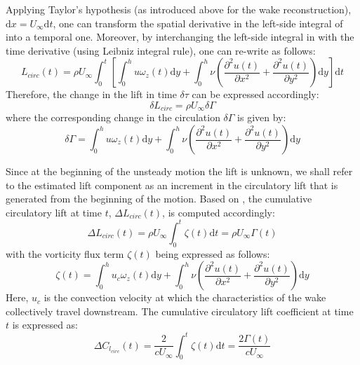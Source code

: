 \documentclass[12pt,a4paper]{article}
\begin{document}
Applying Taylor's hypothesis (as introduced above for the wake reconstruction), $\mathrm{d} x = U_\infty \mathrm{d}t$, one can transform the spatial derivative in the left-side integral of  into a temporal one. 
Moreover, by interchanging the left-side integral in  with the time derivative (using Leibniz integral rule), one can re-write  as follows:
\begin{equation}
L_{circ}(t) = \rho U_\infty \int_0^t \left[ \int_0^h u\omega_z(t)\mathrm{d}y +  \int_0^h\nu \left( \frac{\partial^2u(t)}{\partial x^2} + \frac{\partial^2u(t)}{\partial y^2} \right)\mathrm{d}y \right] \mathrm{d}t
\label{eq:inst_Lift2}
\end{equation}
Therefore, the change in the lift in time $\delta\tau$ can be expressed accordingly:
\begin{equation}
\delta L_{circ} = \rho U_\infty  \delta\Gamma
\label{eq:delL}
\end{equation}
where the corresponding change in the circulation $\delta \Gamma$ is given by:
\begin{equation}
\delta\Gamma =  \int_0^h u\omega_z(t)\mathrm{d}y +  \int_0^h\nu \left( \frac{\partial^2u(t)}{\partial x^2} + \frac{\partial^2u(t)}{\partial y^2} \right)\mathrm{d}y
\label{eq:delGamma}
\end{equation}

Since at the beginning of the unsteady motion the lift is unknown, we shall refer to the estimated lift component as an increment in the circulatory lift \cite{Stalnov2015,BenGida2016} that is generated from the beginning of the motion. 
Based on , the cumulative circulatory lift at time $t$, $\Delta L_{circ}(t)$, is computed accordingly:
\begin{equation}
\Delta L_{circ} (t)= \rho U_\infty \int_0^t \zeta(t)\mathrm{d}t = \rho U_\infty \Gamma(t)
\label{eq:dL-circ}
\end{equation}
with the vorticity flux term $\zeta(t)$ being expressed as follows:
\begin{equation}
\zeta(t) = \int_0^h u_c\omega_z(t)\mathrm{d}y +  \int_0^h\nu \left( \frac{\partial^2u(t)}{\partial x^2} + \frac{\partial^2u(t)}{\partial y^2} \right)\mathrm{d}y
\label{eq:zeta_vs_time}
\end{equation}
Here, $u_c$ is the convection velocity at which the characteristics of the wake collectively travel downstream.
The cumulative circulatory lift coefficient at time $t$ is expressed as:
\begin{equation}
\Delta C_{l_{circ}}(t) = \frac{2}{cU_\infty} \int_0^t \zeta(t)\mathrm{d}t = \frac{2\Gamma(t)}{cU_\infty}
\label{eq:dCl-circ}
\end{equation}
\end{document}
